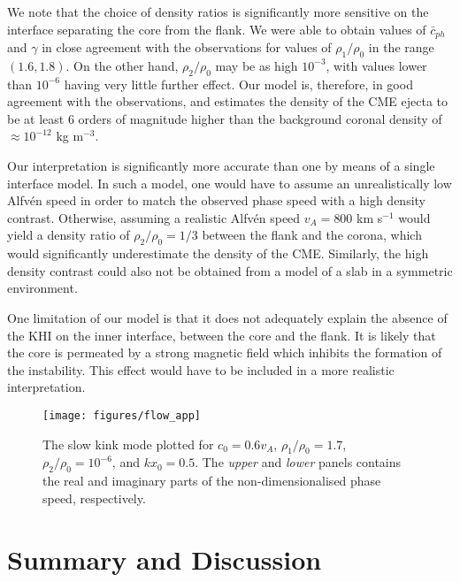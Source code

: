 \documentclass[12pt]{ociamthesis}
\begin{document}
We note that the choice of density ratios is significantly more sensitive on the interface separating the core from the flank.
We were able to obtain values of $\bar c_{ph}$ and $\gamma$ in close agreement with the observations for values of $\rho_1/\rho_0$ in the range $(1.6 , 1.8)$.
On the other hand, $\rho_2/\rho_0$ may be as high $10^{-3}$, with values lower than $10^{-6}$ having very little further effect.
Our model is, therefore, in good agreement with the observations, and estimates the density of the CME ejecta to be at least 6 orders of magnitude higher than the background coronal density of $\approx 10^{-12}$ kg m$^{-3}$.

Our interpretation is significantly more accurate than one by means of a single interface model.
In such a model, one would have to assume an unrealistically low Alfv\'en speed in order to match the observed phase speed with a high density contrast.
Otherwise, assuming a realistic Alfv\'en speed $v_A = 800$ km s$^{-1}$ would yield a density ratio of $\rho_2 / \rho_0 = 1/3$ between the flank and the corona, which would significantly underestimate the density of the CME.
Similarly, the high density contrast could also not be obtained from a model of a slab in a symmetric environment.

One limitation of our model is that it does not adequately explain the absence of the KHI on the inner interface, between the core and the flank.
It is likely that the core is permeated by a strong magnetic field which inhibits the formation of the instability.
This effect would have to be included in a more realistic interpretation.

\begin{figure}[!t]
\centering
\texttt{[image: figures/flow\_app]}
\caption{The slow kink mode plotted for $c_0 = 0.6 v_A$, $\rho_1/\rho_0 = 1.7$, $\rho_2/\rho_0 = 10^{-6}$, and $k x_0 = 0.5$. The \textit{upper} and \textit{lower} panels contains the real and imaginary parts of the non-dimensionalised phase speed, respectively.}
\label{flow_app}
\end{figure}



\section{Summary and Discussion}
\label{sec:c2discussion}
\end{document}
